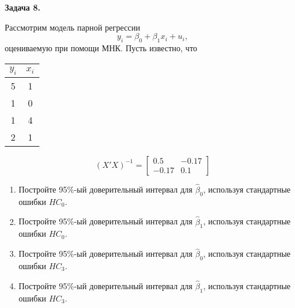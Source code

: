 \documentclass[10pt, a4paper]{extarticle}
\begin{document}
	{\Large \textbf{Задача 8.}}
	
	Рассмотрим модель парной регрессии
	\[
	y_i = \beta_0 + \beta_1x_i + u_i,
	\]
	оцениваемую при помощи МНК. Пусть известно, что 
	
	\begin{center}
	\begin{tabular}{c|c}
		$y_i$ & $x_i$ \\
		\hline
		5 & 1 \\
		1 & 0 \\
		1 & 4 \\
		2 & 1
	\end{tabular}
	\end{center}
	\[
	(X'X)^{-1} = \begin{bmatrix}
		0.5 & -0.17 \\
		-0.17 &  0.1
	\end{bmatrix}
	\]

	\begin{enumerate}[label = \alph*)]		
		\item Постройте 95\%-ый доверительный интервал для $\hat{\beta}_0$, используя стандартные ошибки $HC_0$.
		\item Постройте 95\%-ый доверительный интервал для $\hat{\beta}_1$, используя стандартные ошибки $HC_0$.
		\item Постройте 95\%-ый доверительный интервал для $\hat{\beta}_0$, используя стандартные ошибки $HC_3$.
		\item Постройте 95\%-ый доверительный интервал для $\hat{\beta}_1$, используя стандартные ошибки $HC_3$.
	\end{enumerate}
	
\end{document}
